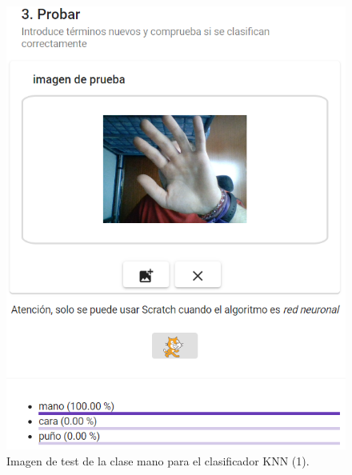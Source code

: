 \documentclass[a4paper, 12pt]{book}
\begin{document}
\begin{figure}
	\centering
	\includegraphics[width=12cm, keepaspectratio]{img/testmanoknnbien}
	\caption{Imagen de test de la clase mano para el clasificador KNN (1).}			
	\label{fig:testmanoknnbien}
\end{figure}
\end{document}
